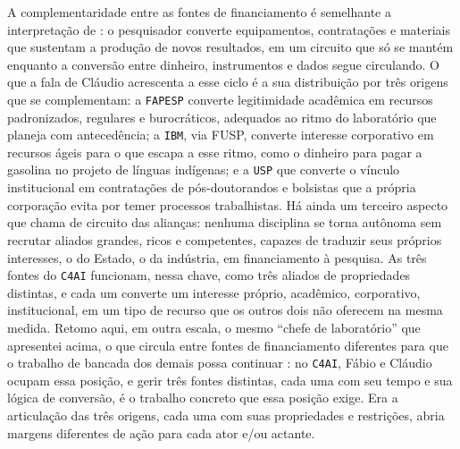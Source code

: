 A complementaridade entre as fontes de financiamento é semelhante a interpretação de \textcite{Latour1997VidaLaboratorio}: o pesquisador converte equipamentos, contratações e materiais que sustentam a produção de novos resultados, em um circuito que só se mantém enquanto a conversão entre dinheiro, instrumentos e dados segue circulando. O que a fala de Cláudio acrescenta a esse ciclo é a sua distribuição por três origens que se complementam: a \texttt{FAPESP} converte legitimidade acadêmica em recursos padronizados, regulares e burocráticos, adequados ao ritmo do laboratório que planeja com antecedência; a \texttt{IBM}, via FUSP, converte interesse corporativo em recursos ágeis para o que escapa a esse ritmo, como o dinheiro para pagar a gasolina no projeto de línguas indígenas; e a \texttt{USP} que converte o vínculo institucional em contratações de pós-doutorandos e bolsistas que a própria corporação evita por temer processos trabalhistas. Há ainda um terceiro aspecto que \textcite{Latour2017Esperanca} chama de circuito das alianças: nenhuma disciplina se torna autônoma sem recrutar aliados grandes, ricos e competentes, capazes de traduzir seus próprios interesses, o do Estado, o da indústria, em financiamento à pesquisa. As três fontes do \texttt{C4AI} funcionam, nessa chave, como três aliados de propriedades distintas, e cada um converte um interesse próprio, acadêmico, corporativo, institucional, em um tipo de recurso que os outros dois não oferecem na mesma medida. Retomo aqui, em outra escala, o mesmo \enquote{chefe de laboratório} que apresentei acima, o que circula entre fontes de financiamento diferentes para que o trabalho de bancada dos demais possa continuar \parencite[p.~257]{Latour2011CienciaEmAcao}: no \texttt{C4AI}, Fábio e Cláudio ocupam essa posição, e gerir três fontes distintas, cada uma com seu tempo e sua lógica de conversão, é o trabalho concreto que essa posição exige. Era a articulação das três origens, cada uma com suas propriedades e restrições, abria margens diferentes de ação para cada ator e/ou actante. 

